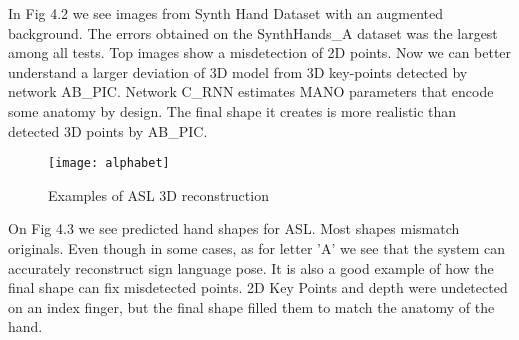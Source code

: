 In Fig 4.2 we see images from Synth Hand Dataset with an augmented background. The errors obtained on the SynthHands\_A dataset was the largest among all tests. Top images show a misdetection of 2D points. Now we can better understand a larger deviation of 3D model from 3D key-points detected by network AB\_PIC. Network C\_RNN estimates MANO parameters that encode some anatomy by design. The final shape it creates is more realistic than detected 3D points by AB\_PIC. 

\begin{figure}[H]
\caption{Examples of ASL 3D reconstruction}
\centering
\texttt{[image: alphabet]}
\end{figure}

On Fig 4.3 we see predicted hand shapes for ASL. Most shapes mismatch originals. Even though in some cases, as for letter 'A' we see that the system can accurately reconstruct sign language pose. It is also a good example of how the final shape can fix misdetected points. 2D Key Points and depth were undetected on an index finger, but the final shape filled them to match the anatomy of the hand.